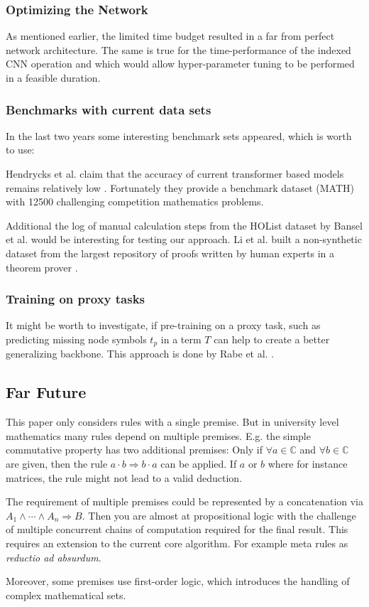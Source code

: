 \documentclass{scrartcl}
\theoremstyle{definition}
\begin{document}
\subsubsection{Optimizing the Network}

As mentioned earlier, the limited time budget resulted in a far from perfect network architecture.
The same is true for the time-performance of the indexed CNN operation and which would allow hyper-parameter tuning to be performed in a feasible duration.

\subsubsection{Benchmarks with current data sets}

In the last two years some interesting benchmark sets appeared, which is worth to use:

Hendrycks et al. claim that the accuracy of current transformer based models remains relatively low \cite{hendrycks2021measuring}.
Fortunately they provide a benchmark dataset (MATH) with 12500 challenging competition mathematics problems.

Additional the log of manual calculation steps from the HOList dataset by Bansel et al. \cite{kaliszyk2017holstep} would be interesting for testing our approach.
Li et al. built a non-synthetic dataset from the largest repository of proofs written by human experts in a theorem prover \cite{li2021isarstep}.

\subsubsection{Training on proxy tasks}

It might be worth to investigate, if pre-training on a proxy task, such as predicting missing node symbols $t_p$ in a term $T$ can help to create a better generalizing backbone.
This approach is done by Rabe et al. \cite{rabe2020mathematical}.

\subsection{Far Future}

This paper only considers rules with a single premise.
But in university level mathematics many rules depend on multiple premises.
E.g. the simple commutative property has two additional premises: Only if $\forall a \in \mathbb{C}$ and $\forall b \in \mathbb{C}$ are given,
then the rule $a\cdot b \Longrightarrow b\cdot a$ can be applied. If $a$ or $b$ where for instance matrices, the rule might not lead to a valid deduction.

The requirement of multiple premises could be represented by a concatenation via $A_1 \wedge \cdots \wedge A_n \Longrightarrow B$.
Then you are almost at propositional logic with the challenge of multiple concurrent chains of computation required for the final result.
This requires an extension to the current core algorithm. For example meta rules as \textit{reductio ad absurdum}.

Moreover, some premises use first-order logic, which introduces the handling of complex mathematical sets.


\printbibliography
\end{document}
